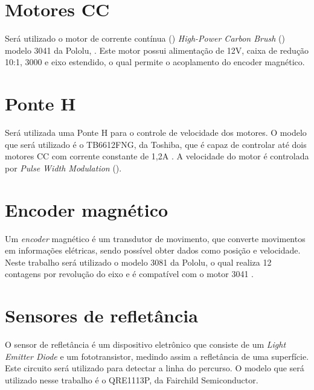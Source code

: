 \section{Motores CC} \label{cap:motores}
Será utilizado o motor de corrente contínua () 
\textit{High-Power Carbon Brush} () modelo 3041 da Pololu, %
\cite{pololu_motor}. Este motor possui alimentação de 12V, caixa de redução 10:1, 3000 
 e eixo estendido, o qual permite o acoplamento do encoder magnético. 

\vspace{0.5cm}

\section{Ponte H} \label{cap:ponteh}
Será utilizada uma Ponte H para o controle de velocidade dos motores. O modelo que será utilizado é o TB6612FNG, da 
Toshiba, que é capaz de controlar até dois motores CC com corrente constante de 1,2A \cite{ponte}. 
A velocidade do motor é controlada por \textit{Pulse Width Modulation} ().


\vspace{0.5cm}

\section{Encoder magnético} \label{cap:encoder}
Um \textit{encoder} magnético é um transdutor de movimento, que converte movimentos em informações elétricas, %
sendo possível obter dados como posição e velocidade. Neste trabalho será utilizado o modelo 3081 da 
Pololu, %
o qual realiza 12 contagens por revolução do eixo e é compatível com o motor 3041 
\cite{pololu_encoder}.

\vspace{0.5cm}

\section{Sensores de refletância} \label{cap:reflet}
O sensor de refletância é um dispositivo eletrônico que consiste de um \textit{Light Emitter Diode} 
 e um fototransistor, medindo assim a refletância de uma superfície. Este circuito 
será utilizado para detectar a linha do percurso. 
O modelo que será utilizado nesse trabalho é o QRE1113P, da Fairchild %
Semiconductor\cite{reflet}.
\vspace{0.5cm}

